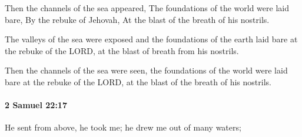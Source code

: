 			\begin{versebox}
					\item[BHS] 
					\item[ASV] Then the channels of the sea appeared, The foundations of the world were laid bare, By the rebuke of Jehovah, At the blast of the breath of his nostrils.
					\item[NIV] The valleys of the sea were exposed and the foundations of the earth laid bare at the rebuke of the LORD, at the blast of breath from his nostrils.
					\item[NRSV] Then the channels of the sea were seen, the foundations of the world were laid bare at the rebuke of the LORD, at the blast of the breath of his nostrils.
			\end{versebox}

		\paragraph{2 Samuel 22:17} %
			\label{2SAMUEL-22-17}

			He sent from above, he took me; he drew me out of many waters;

